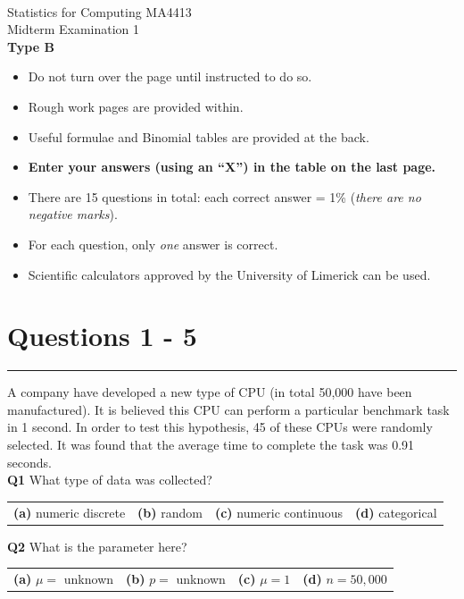 \documentclass[12pt]{article}
\begin{document}
\quad\\[2cm]

\begin{center}
{\Huge Statistics for Computing MA4413\\[0.8cm]
Midterm Examination 1\\[1cm]
{\bf Type B}}\\[2cm]
\end{center}

\begin{itemize}\itemsep0.6cm
\item Do not turn over the page until instructed to do so.
\item Rough work pages are provided within.
\item Useful formulae and Binomial tables are provided at the back.
\item {\bf Enter your answers (using an ``X'') in the table on the last page.}
\item There are 15 questions in total: each correct answer = 1\% (\emph{there are no negative marks}).
\item For each question, only \emph{one} answer is correct.
\item Scientific calculators approved by the University of Limerick can be used.
\end{itemize}

\newpage
\section*{Questions 1 - 5}

\rule{\linewidth}{1pt}
\quad

A company have developed a new type of CPU (in total 50,000 have been manufactured). It is believed this CPU can perform a particular benchmark task in 1 second. In order to test this hypothesis, 45 of these CPUs were randomly selected. It was found that the average time to complete the task was 0.91 seconds.\\[0.3cm]

{\bf Q1} What type of data was collected?\\[0.2cm]
\begin{tabular}{cccc}
{\bf(a)} numeric discrete & {\bf(b)} random & {\bf(c)} numeric continuous & {\bf(d)} categorical \\[0.6cm]
\end{tabular}

{\bf Q2} What is the parameter here?\\[0.2cm]
\begin{tabular}{cccc}
{\bf(a)} $\mu =$ unknown & {\bf(b)} $p =$ unknown & {\bf(c)} $\mu = 1$ & {\bf(d)} $n = 50,000$ \\[0.6cm]
\end{tabular}
\end{document}
